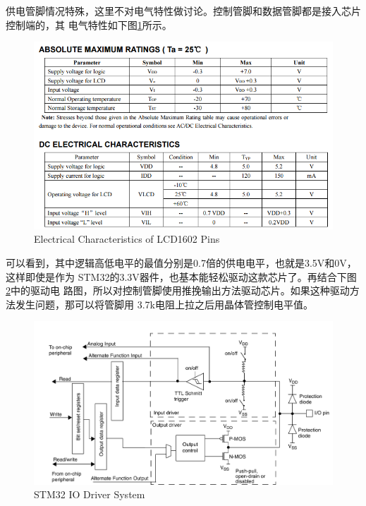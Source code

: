\documentclass[a4paper]{ctexart}
\begin{document}
供电管脚情况特殊，这里不对电气特性做讨论。控制管脚和数据管脚都是接入芯片控制端的，其
电气特性如下图\ref{elec1602}所示。
\begin{figure}[h]
  \centering\includegraphics[width=\textwidth]{./img/1602_elec.png}
  \caption{Electrical Characteristics of LCD1602 Pins}\label{elec1602}
\end{figure}

可以看到，其中逻辑高低电平的最值分别是0.7倍的供电电平，也就是3.5V和0V，这样即使是作为
STM32的3.3V器件，也基本能轻松驱动这款芯片了。再结合下图\ref{stm32iodriver}中的驱动电
路图，所以对控制管脚使用推挽输出方法驱动芯片。如果这种驱动方法发生问题，那可以将管脚用
3.7k电阻上拉之后用晶体管控制电平值。
\begin{figure}[h]
  \centering\includegraphics[width=\textwidth]{./img/ioport.png}
  \caption{STM32 IO Driver System}\label{stm32iodriver}
\end{figure}
\end{document}
